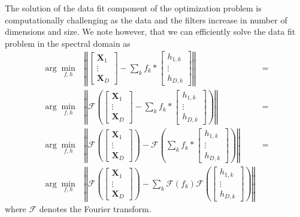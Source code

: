 \documentclass[12pt, a4paper, twoside,draft]{article}
\begin{document}
The solution of the data fit component of the optimization problem is computationally challenging as the data and the filters increase in number of dimensions and size.
We note however, that we can efficiently solve the data fit problem in the spectral domain as
\begin{align}
  \arg \min_{f,h} & \left\Vert \left[ \begin{matrix}\mathbf{X}_1 \\ \vdots \\ \mathbf{X}_D \end{matrix} \right] - \sum_k f_k \ast  \left[ \begin{matrix}h_{1,k} \\ \vdots \\ h_{D,k} \end{matrix} \right] \right\Vert  &=   \nonumber \\
  \arg \min_{f,h} & \left\Vert \mathcal{F}\left(\left[ \begin{matrix}\mathbf{X}_1 \\ \vdots \\ \mathbf{X}_D \end{matrix} \right] - \sum_k f_k \ast  \left[ \begin{matrix}h_{1,k} \\ \vdots \\ h_{D,k} \end{matrix} \right] \right) \right\Vert & = \nonumber \\
  \arg \min_{f,h} & \left\Vert \mathcal{F}\left(\left[ \begin{matrix}\mathbf{X}_1 \\ \vdots \\ \mathbf{X}_D \end{matrix} \right] \right) - \mathcal{F}\left(\sum_k f_k \ast  \left[ \begin{matrix}h_{1,k} \\ \vdots \\ h_{D,k} \end{matrix} \right] \right) \right\Vert & = \nonumber \\
  \arg \min_{f,h} & \left\Vert \mathcal{F}\left(\left[ \begin{matrix}\mathbf{X}_1 \\ \vdots \\ \mathbf{X}_D \end{matrix} \right] \right) - \sum_k \mathcal{F}(f_k)   \mathcal{F}\left(\left[ \begin{matrix}h_{1,k} \\ \vdots \\ h_{D,k} \end{matrix} \right] \right) \right\Vert &
\end{align}
where $\mathcal{F}$ denotes the Fourier transform.
\end{document}
